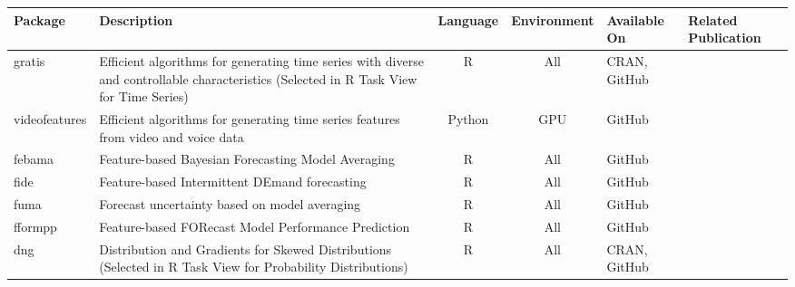 \documentclass[twoside,a4paper]{article}
\begin{document}
\begin{refsection}
\begin{center}
\begin{tabular}{lp{6cm}cclp{3cm}}
  \toprule
  Package     & Description                                                                                                                             & Language & Environment & Available On & Related Publication                                         \\
  \midrule
gratis        & Efficient algorithms for generating time series with diverse and controllable characteristics (Selected in R Task View for Time Series) & R        & All         & CRAN, GitHub & \citet{KangY2020GRATISGeneRAting}
                                                                                                                                                                                                                                                              \\
videofeatures & Efficient algorithms for generating time series features from video and voice data                                                      & Python   & GPU         & GitHub                                                                     \\
febama        & Feature-based Bayesian Forecasting Model Averaging                                                                                      & R        & All         & GitHub       & \citet{LiL2023BayesianForecast}                             \\
fide          & Feature-based Intermittent DEmand forecasting                                                                                           & R        & All         & GitHub       & \citet{LiL2023FeaturebasedIntermittent}                     \\
fuma          & Forecast uncertainty based on model averaging                                                                                           & R        & All         & GitHub       & \citet{WangX2022UncertaintyEstimation}                      \\
fformpp       & Feature-based FORecast Model Performance Prediction                                                                                     & R        & All         & GitHub       & \citet{TalagalaTS2022FFORMPPFeaturebased}                   \\
dng           & Distribution and Gradients for Skewed Distributions (Selected in R Task View for Probability Distributions)                             & R        & All         & CRAN, GitHub & \citet{LiF2010FlexibleModeling,LiF2011ModellingConditional} \\

\end{tabular}
\end{center}
\end{refsection}
\end{document}
